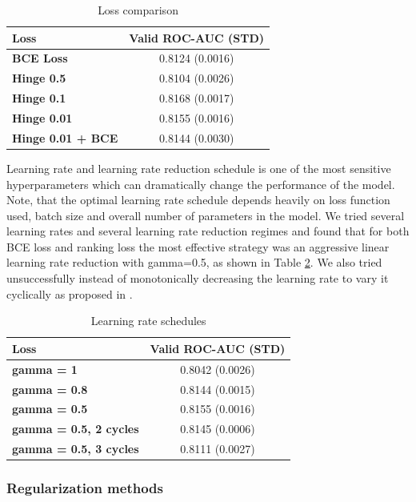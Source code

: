 \documentclass[sigconf]{acmart}
\begin{document}
\begin{table}[ht]
\caption{Loss comparison}
\begin{tabular}{ | l | c |  }
\hline
\textbf{Loss} & \textbf{Valid ROC-AUC (STD)} \\
\hline
\textbf{BCE Loss} & 0.8124 (0.0016)  \\
\textbf{Hinge 0.5} & 0.8104 (0.0026)  \\
\textbf{Hinge 0.1} & 0.8168 (0.0017)  \\
\textbf{Hinge 0.01} & 0.8155 (0.0016)  \\
\textbf{Hinge 0.01 + BCE} & 0.8144 (0.0030)  \\
\hline
\end{tabular}
\label{tab-loss}
\end{table}

Learning rate and learning rate reduction schedule is one of the most sensitive hyperparameters which can dramatically change the performance of the model.
Note, that the optimal learning rate schedule depends heavily on loss function used, batch size and overall number of parameters in the model.
We tried several learning rates and several learning rate reduction regimes and found that for both BCE loss and ranking loss the most effective strategy was an aggressive linear learning rate reduction with gamma=0.5, as shown in Table \ref{tab-lr}. We also tried unsuccessfully instead of monotonically decreasing the learning rate to vary it cyclically as proposed in \cite{smith2017cyclical}.

\begin{table}[ht]
\caption{Learning rate schedules}
\begin{tabular}{ | l | c |  }
\hline
\textbf{Loss} & \textbf{Valid ROC-AUC (STD)} \\
\hline
\textbf{gamma = 1} & 0.8042 (0.0026)  \\
\textbf{gamma = 0.8} & 0.8144 (0.0015)  \\
\textbf{gamma = 0.5} & 0.8155 (0.0016)  \\
\textbf{gamma = 0.5, 2 cycles} & 0.8145 (0.0006)  \\
\textbf{gamma = 0.5, 3 cycles} & 0.8111 (0.0027)  \\
\hline
\end{tabular}
\label{tab-lr}
\end{table}

\subsubsection{Regularization methods}
\end{document}
